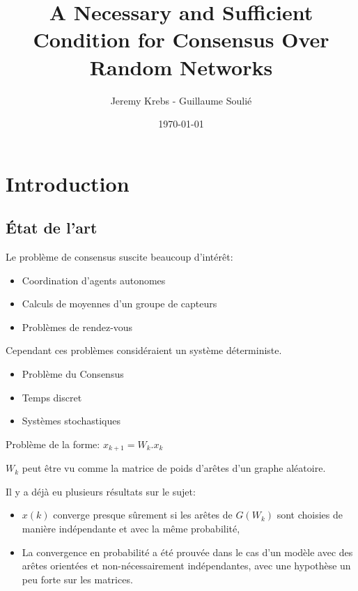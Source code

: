 \documentclass{beamer}
\title{A Necessary and Sufficient Condition for
Consensus Over Random Networks}
\author{Jeremy Krebs - Guillaume Soulié}
\institute{Université Paris Saclay}
\date{\today}
\begin{document}
\begin{frame}
\titlepage
\end{frame}

\begin{frame}
  \tableofcontents
\end{frame}      



\section{Introduction}
	\subsection{État de l'art}

\begin{frame}
		Le problème de consensus suscite beaucoup d'intérêt:
		 \begin{itemize}
		 	\item Coordination d'agents autonomes
		 	\pause
		 	\item Calculs de moyennes d'un groupe de capteurs
		 	\pause
		 	\item Problèmes de rendez-vous
		 \end{itemize}
		 
		 \pause
		 
		 Cependant ces problèmes considéraient un système déterministe.
\end{frame}		

\begin{frame}
	\begin{itemize}
		\item Problème du Consensus 
		\item Temps discret 
		\item Systèmes stochastiques
	\end{itemize}
	
	\pause
	
	Problème de la forme:
	$ x_{k+1} = W_k . x_k $
	
	$W_k$ peut être vu comme la matrice de poids d'arêtes d'un graphe aléatoire.
\end{frame}

\begin{frame}
	Il y a déjà eu plusieurs résultats sur le sujet:
	\begin{itemize}
		\item $x(k)$ converge presque sûrement si les arêtes de $G(W_k)$ sont choisies de manière indépendante et avec la même probabilité,
		\pause
		\item La convergence en probabilité a été prouvée dans le cas d'un modèle avec des arêtes orientées et non-nécessairement indépendantes, avec une hypothèse un peu forte sur les matrices.
	\end{itemize}
\end{frame}
\end{document}
